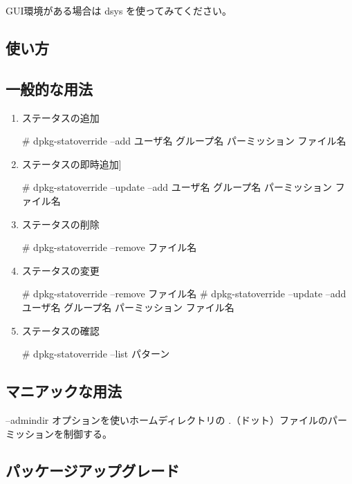 \documentclass[mingoth,a4paper]{jsarticle}
\begin{document}
  GUI環境がある場合は dsys を使ってみてください。

\subsection{使い方}

  \subsection{一般的な用法}

  \begin{enumerate}
  \item ステータスの追加

    \# dpkg-statoverride --add ユーザ名 グループ名 パーミッション ファイル名

  \item ステータスの即時追加]
  
    \# dpkg-statoverride --update --add ユーザ名 グループ名 パーミッション ファイル名

  \item ステータスの削除

    \# dpkg-statoverride --remove ファイル名   

  \item ステータスの変更 

     \# dpkg-statoverride --remove ファイル名 
     \# dpkg-statoverride --update --add ユーザ名 グループ名 パーミッション ファイル名

  \item ステータスの確認
     
     \# dpkg-statoverride --list パターン

  \end{enumerate}


  \subsection{マニアックな用法}

  --admindir オプションを使いホームディレクトリの .（ドット）ファイルのパーミッションを制御する。

  \subsection{パッケージアップグレード}
\end{document}
